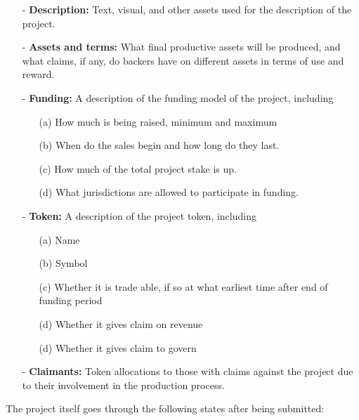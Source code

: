 \documentclass{article}
\begin{document}
\begin{itemize}
    \item[-] \textbf{Description:} Text, visual, and other assets used for the description of the project.
    \item[-] \textbf{Assets and terms:} What final productive assets will be produced, and what claims, if any, do backers have on different assets in terms of use and reward.
    \item[-] \textbf{Funding:} A description of the funding model of the project, including

        \begin{itemize}
            \item[(a)] How much is being raised, minimum and maximum
            \item[(b)] When do the sales begin and how long do they last.
            \item[(c)] How much of the total project stake is up.
            \item[(d)] What jurisdictions are allowed to participate in funding.
        \end{itemize}

    \item[-] \textbf{Token:} A description of the project token, including

        \begin{itemize}
            \item[(a)] Name
            \item[(b)] Symbol
            \item[(c)] Whether it is trade able, if so at what earliest time after end of funding period
            \item[(d)] Whether it gives claim on revenue
            \item[(d)] Whether it gives claim to govern
        \end{itemize}

    \item[-] \textbf{Claimants:} Token allocations to those with claims against the project due to their involvement in the production process.

\end{itemize}

The project itself goes through the following states after being submitted:
\end{document}

